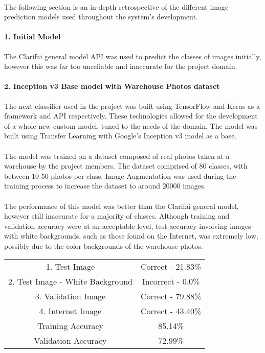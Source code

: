 \documentclass[a4paper, 11pt]{article}
\begin{document}
        \paragraph{}
        The following section is an in-depth retrospective of the different image prediction models used throughout the system’s development.
        
        \paragraph{1. Initial Model}
        The Clarifai general model API was used to predict the classes of images initially, however this was far too unreliable and inaccurate for the project domain.
        \paragraph{2. Inception v3 Base model with Warehouse Photos dataset}
        The next classifier used in the project was built using TensorFlow and Keras as a framework and API respectively. These technologies allowed for the development of a whole new custom model, tuned to the needs of the domain. The model was built using Transfer Learning with Google’s Inception v3 model as a base.
        \paragraph{}
        The model was trained on a dataset composed of real photos taken at a warehouse by the project members. The dataset comprised of 80 classes, with between 10-50 photos per class. Image Augmentation was used during the training process to increase the dataset to around 20000 images.
        \paragraph{}
        The performance of this model was better than the Clarifai general model, however still inaccurate for a majority of classes. Although training and validation accuracy were at an acceptable level, test accuracy involving images with white backgrounds, such as those found on the Internet, was extremely low, possibly due to the color backgrounds of the warehouse photos.
        \begin{center}
        \begin{tabular}{ |c|c| } 
         \hline
         1. Test Image & Correct - 21.83\% \\ 
         2. Test Image - White Background & Incorrect - 0.0\% \\ 
         3. Validation Image & Correct - 79.88\% \\
         4. Internet Image & Correct - 43.40\%\\
         \hline
         Training Accuracy & 85.14\%\\
         Validation Accuracy & 72.99\%\\
         \hline
        \end{tabular}
        \end{center}
        
\end{document}
